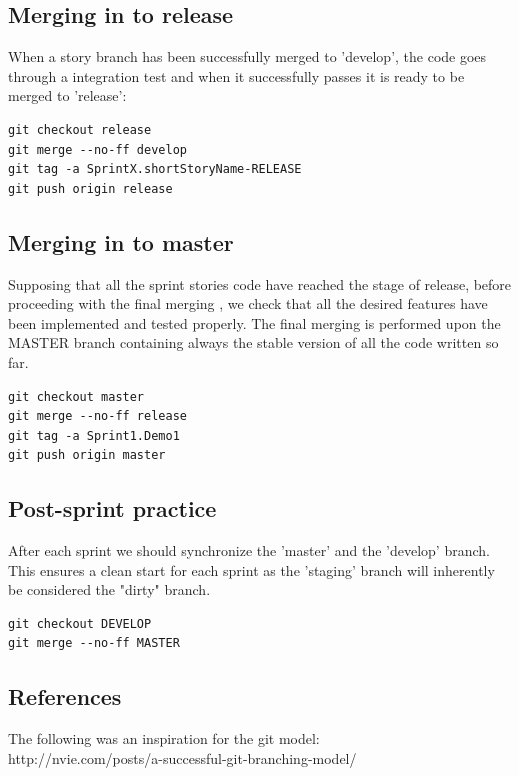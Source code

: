 \subsection{Merging in to release}
When a story branch has been successfully merged to 'develop', the code goes through a integration test and when it successfully passes it is ready to be merged to 'release': 
\begin{verbatim}
git checkout release
git merge --no-ff develop
git tag -a SprintX.shortStoryName-RELEASE
git push origin release
\end{verbatim}
\subsection{Merging in to master}
Supposing that all the sprint stories code have reached the stage of release, before proceeding with the final merging , we check that all the desired features have been implemented and tested properly.
The final merging is performed upon the MASTER branch containing always the stable version of all the code written so far.
  \begin{verbatim}
git checkout master
git merge --no-ff release
git tag -a Sprint1.Demo1
git push origin master
\end{verbatim}
\subsection{Post-sprint practice}

After each sprint we should synchronize the 'master' and the 'develop' branch. This ensures a clean start for each sprint as the 'staging' branch will inherently be considered the "dirty" branch. 

  \begin{verbatim}
git checkout DEVELOP
git merge --no-ff MASTER
\end{verbatim}

\subsection{References}
The following was an inspiration for the git model:\\

http://nvie.com/posts/a-successful-git-branching-model/
 \\
